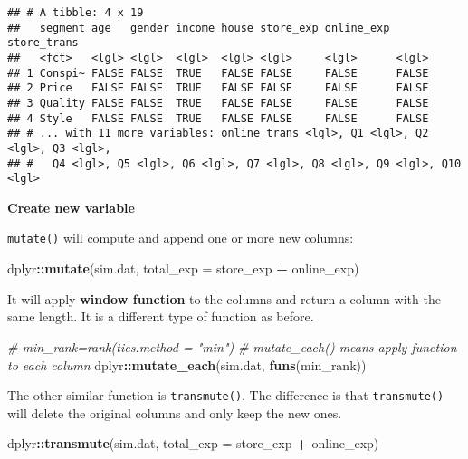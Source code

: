 \documentclass[
]{article}
\newenvironment{Shaded}{\begin{snugshade}}{\end{snugshade}}
\newcommand{\CommentTok}[1]{\textcolor[rgb]{0.56,0.35,0.01}{\textit{#1}}}
\newcommand{\DataTypeTok}[1]{\textcolor[rgb]{0.13,0.29,0.53}{#1}}
\newcommand{\KeywordTok}[1]{\textcolor[rgb]{0.13,0.29,0.53}{\textbf{#1}}}
\newcommand{\NormalTok}[1]{#1}
\newcommand{\OperatorTok}[1]{\textcolor[rgb]{0.81,0.36,0.00}{\textbf{#1}}}
\newcommand{\StringTok}[1]{\textcolor[rgb]{0.31,0.60,0.02}{#1}}
\begin{document}
\begin{verbatim}
## # A tibble: 4 x 19
##   segment age   gender income house store_exp online_exp store_trans
##   <fct>   <lgl> <lgl>  <lgl>  <lgl> <lgl>     <lgl>      <lgl>      
## 1 Conspi~ FALSE FALSE  TRUE   FALSE FALSE     FALSE      FALSE      
## 2 Price   FALSE FALSE  TRUE   FALSE FALSE     FALSE      FALSE      
## 3 Quality FALSE FALSE  TRUE   FALSE FALSE     FALSE      FALSE      
## 4 Style   FALSE FALSE  TRUE   FALSE FALSE     FALSE      FALSE      
## # ... with 11 more variables: online_trans <lgl>, Q1 <lgl>, Q2 <lgl>, Q3 <lgl>,
## #   Q4 <lgl>, Q5 <lgl>, Q6 <lgl>, Q7 <lgl>, Q8 <lgl>, Q9 <lgl>, Q10 <lgl>
\end{verbatim}

\textbf{Create new variable}

\texttt{mutate()} will compute and append one or more new columns:

\begin{Shaded}
\begin{Highlighting}[]
\NormalTok{dplyr}\OperatorTok{::}\KeywordTok{mutate}\NormalTok{(sim.dat, }\DataTypeTok{total_exp =}\NormalTok{ store_exp }\OperatorTok{+}\StringTok{ }\NormalTok{online_exp)}
\end{Highlighting}
\end{Shaded}

It will apply \textbf{window function} to the columns and return a
column with the same length. It is a different type of function as
before.

\begin{Shaded}
\begin{Highlighting}[]
\CommentTok{# min_rank=rank(ties.method = "min")}
\CommentTok{# mutate_each() means apply function to each column}
\NormalTok{dplyr}\OperatorTok{::}\KeywordTok{mutate_each}\NormalTok{(sim.dat, }\KeywordTok{funs}\NormalTok{(min_rank)) }
\end{Highlighting}
\end{Shaded}

The other similar function is \texttt{transmute()}. The difference is
that \texttt{transmute()} will delete the original columns and only keep
the new ones.

\begin{Shaded}
\begin{Highlighting}[]
\NormalTok{dplyr}\OperatorTok{::}\KeywordTok{transmute}\NormalTok{(sim.dat, }\DataTypeTok{total_exp =}\NormalTok{ store_exp }\OperatorTok{+}\StringTok{ }\NormalTok{online_exp) }
\end{Highlighting}
\end{Shaded}
\end{document}
